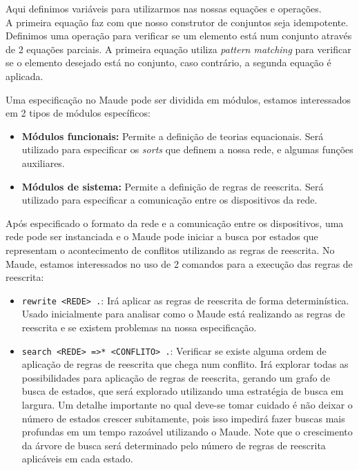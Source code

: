 \noindent
Aqui definimos variáveis para utilizarmos nas nossas equações e operações. \\
A primeira equação faz com que nosso construtor de conjuntos seja idempotente. \\
Definimos uma operação para verificar se um elemento está num conjunto através de 2 equações parciais. A primeira equação utiliza \textit{pattern matching} para verificar se o elemento desejado está no conjunto, caso contrário, a segunda equação é aplicada.

Uma especificação no Maude pode ser dividida em módulos, estamos interessados em 2 tipos de módulos específicos:
\begin{itemize}
  \item \textbf{Módulos funcionais:} Permite a definição de teorias equacionais. Será utilizado para especificar os \textit{sorts} que definem a nossa rede, e algumas funções auxiliares.
  \item \textbf{Módulos de sistema:} Permite a definição de regras de reescrita. Será utilizado para especificar a comunicação entre os dispositivos da rede.
\end{itemize}

\noindent
Após especificado o formato da rede e a comunicação entre os dispositivos, uma rede pode ser instanciada e o Maude pode iniciar a busca por estados que representam o acontecimento de conflitos utilizando as regras de reescrita. No Maude, estamos interessados no uso de 2 comandos para a execução das regras de reescrita:
\begin{itemize}
  \item \texttt{rewrite <REDE> .}: Irá aplicar as regras de reescrita de forma determinística. Usado inicialmente para analisar como o Maude está realizando as regras de reescrita e se existem problemas na nossa especificação.
  \item \texttt{search <REDE> =>* <CONFLITO> .}: Verificar se existe alguma ordem de aplicação de regras de reescrita que chega num conflito. Irá explorar todas as possibilidades para aplicação de regras de reescrita, gerando um grafo de busca de estados, que será explorado utilizando uma estratégia de busca em largura. Um detalhe importante no qual deve-se tomar cuidado é não deixar o número de estados crescer subitamente, pois isso impedirá fazer buscas mais profundas em um tempo razoável utilizando o Maude. Note que o crescimento da árvore de busca será determinado pelo número de regras de reescrita aplicáveis em cada estado.
\end{itemize}